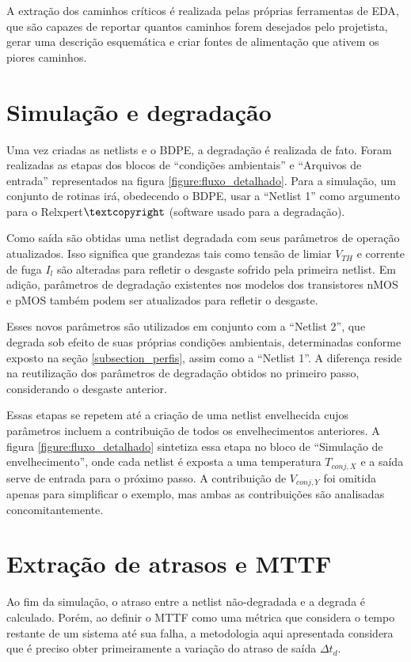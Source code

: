 A extração dos caminhos críticos é realizada pelas próprias ferramentas de EDA, que são capazes de reportar quantos caminhos forem desejados pelo projetista, gerar uma descrição esquemática e criar fontes de alimentação que ativem os piores caminhos.
\section{Simulação e degradação}
\label{section_simulacao}
Uma vez criadas as netlists e o BDPE, a degradação é realizada de fato. Foram realizadas as etapas dos blocos de ``condições ambientais'' e ``Arquivos de entrada'' representados na figura \ref{figure:fluxo_detalhado}. Para a simulação, um conjunto de rotinas irá, obedecendo o BDPE, usar a ``Netlist 1'' como argumento para o Relxpert$\textcopyright$ (software usado para a degradação).

Como saída são obtidas uma netlist degradada com seus parâmetros de operação atualizados. Isso significa que grandezas tais como tensão de limiar $V_{TH}$ e corrente de fuga $I_l$ são alteradas para refletir o desgaste sofrido pela primeira netlist. Em adição, parâmetros de degradação existentes nos modelos dos transistores nMOS e pMOS também podem ser atualizados para refletir o desgaste.

Esses novos parâmetros são utilizados em conjunto com a ``Netlist 2'', que degrada sob efeito de suas próprias condições ambientais, determinadas conforme exposto na seção \ref{subsection_perfis}, assim como a ``Netlist 1''. A diferença reside na reutilização dos parâmetros de degradação obtidos no primeiro passo, considerando o desgaste anterior.

Essas etapas se repetem até a criação de uma netlist envelhecida cujos parâmetros incluem a contribuição de todos os envelhecimentos anteriores. A figura \ref{figure:fluxo_detalhado} sintetiza essa etapa no bloco de ``Simulação de envelhecimento'', onde cada netlist é exposta a uma temperatura $T_{conj,X}$ e a saída serve de entrada para o próximo passo. A contribuição de $V_{conj,Y}$ foi omitida apenas para simplificar o exemplo, mas ambas as contribuições são analisadas concomitantemente. 

\section{Extração de atrasos e MTTF}
\label{section_extracao_resultados}
Ao fim da simulação, o atraso entre a netlist não-degradada e a degrada é calculado. Porém, ao definir o MTTF como uma métrica que considera o tempo restante de um sistema até sua falha, a metodologia aqui apresentada considera que é preciso obter primeiramente a variação do atraso de saída $\Delta t_d$.

